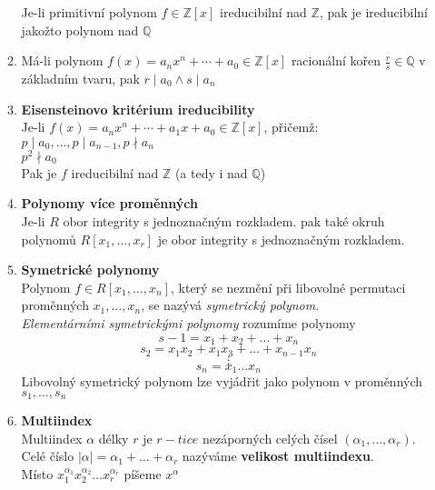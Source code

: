 \documentclass[12pt,a4paper]{article}
\begin{document}
\begin{enumerate}
\begin{enumerate}
					Je-li primitivní polynom $f \in \mathbb{Z}[x]$ ireducibilní  nad $\mathbb{Z}$, pak je ireducibilní jakožto polynom nad $\mathbb{Q}$
				\item Má-li polynom $f(x) = a_nx^n+\cdots+a_0 \in \mathbb{Z}[x]$ racionální kořen $\frac{r}{s} \in \mathbb{Q}$ v základním tvaru, pak $r \mid a_0 \land s \mid a_n$
				\item \textbf{Eisensteinovo kritérium ireducibility}\\
					Je-li $f(x) = a_nx^n+\cdots+a_1x+a_0 \in \mathbb{Z}[x]$, přičemž:\\
					$p \mid a_0, \dots, p \mid a_{n-1},p \nmid a_n$\\
					$p^2 \nmid a_0$\\
					Pak je $f$ ireducibilní nad $\mathbb{Z}$ (a tedy i nad $\mathbb{Q}$)
				\item \textbf{Polynomy více proměnných}\\
					Je-li $R$ obor integrity s jednoznačným rozkladem. pak také okruh polynomů $R[x_1,\dots,x_r]$ je obor integrity s jednoznačným rozkladem.
				\item \textbf{Symetrické polynomy}\\
					Polynom $f \in R[x_1,\dots,x_n]$, který se nezmění při libovolné permutaci proměnných $x_1,\dots,x_n$, se nazývá \textit{symetrický polynom}.\\ \textit{Elementárními symetrickými polynomy} rozumíme polynomy\\
					\[s-1 = x_1 + x_2 + \dots + x_n  \]\[  s_2 = x_1x_2 + x_1x_3 + \dots + x_{n-1}x_n\] \[\vdots\]\[s_n=x_1\dots x_n\]
					Libovolný symetrický polynom lze vyjádřit jako polynom v proměnných $s_1,\dots,s_n$
				\item \textbf{Multiindex}\\
					Multiindex $\alpha$ délky $r$ je  $r-tice$ nezáporných celých čísel $(\alpha_1,\dots,\alpha_r)$.\\ Celé číslo $|\alpha| = \alpha_1+\dots+\alpha_r$ nazýváme \textbf{velikost multiindexu}.\\Místo $x_1^{\alpha_1}x_2^{\alpha_2} \dots x_r^{\alpha_r}$ píšeme $x^\alpha$
				
		\end{enumerate}
	
	
	
		
		
	\end{enumerate}
	
	
\end{document}
